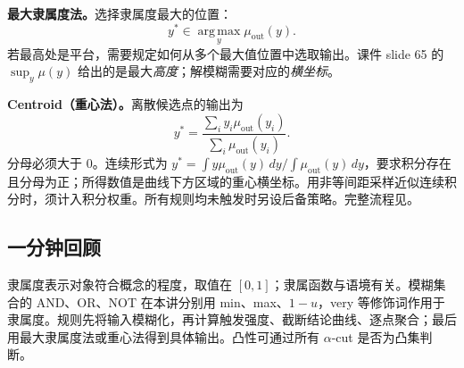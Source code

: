 \textbf{最大隶属度法。}选择隶属度最大的位置：
\[
 y^*\in\operatorname*{arg\,max}_y\mu_{\mathrm{out}}(y).
\]
若最高处是平台，需要规定如何从多个最大值位置中选取输出。课件 slide 65 的 $\sup_y\mu(y)$ 给出的是最大\emph{高度}；解模糊需要对应的\emph{横坐标}。

\textbf{Centroid（重心法）。}离散候选点的输出为
\[
 y^*=\frac{\sum_i y_i\mu_{\mathrm{out}}(y_i)}
 {\sum_i\mu_{\mathrm{out}}(y_i)}.
\]
分母必须大于 $0$。连续形式为 $y^*=\int y\mu_{\mathrm{out}}(y)\,dy\big/\int\mu_{\mathrm{out}}(y)\,dy$，要求积分存在且分母为正；所得数值是曲线下方区域的重心横坐标。用非等间距采样近似连续积分时，须计入积分权重。所有规则均未触发时另设后备策略。完整流程见。

\subsection{一分钟回顾}

隶属度表示对象符合概念的程度，取值在 $[0,1]$；隶属函数与语境有关。模糊集合的 AND、OR、NOT 在本讲分别用 min、max、$1-u$，very 等修饰词作用于隶属度。规则先将输入模糊化，再计算触发强度、截断结论曲线、逐点聚合；最后用最大隶属度法或重心法得到具体输出。凸性可通过所有 $\alpha$-cut 是否为凸集判断。
\endgroup
